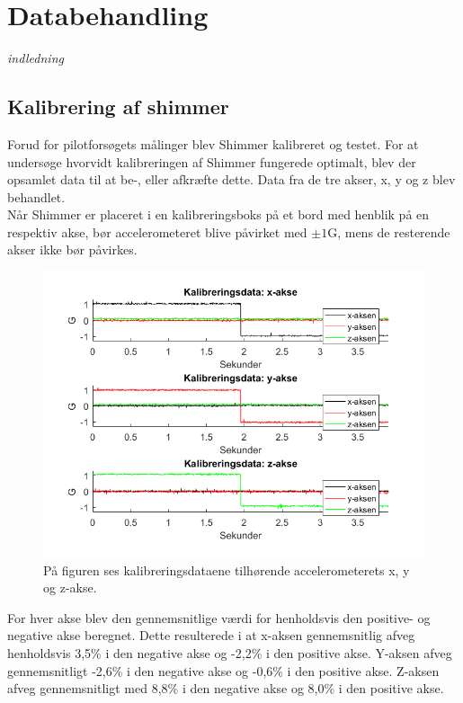 \section{Databehandling}
\textit{indledning}


\subsection{Kalibrering af shimmer}
Forud for pilotforsøgets målinger blev Shimmer kalibreret og testet. For at undersøge hvorvidt kalibreringen af Shimmer fungerede optimalt, blev der opsamlet data til at be-, eller afkræfte dette. Data fra de tre akser, x, y og z blev behandlet. \\
Når Shimmer er placeret i en kalibreringsboks på et bord med henblik på en respektiv akse, bør accelerometeret blive påvirket med $\pm 1$G, mens de resterende akser ikke bør påvirkes.

\begin{figure}[H]
	\centering
	\includegraphics[scale=0.68]{figures/qBilag/kalibreringsdata}
	\caption{På figuren ses kalibreringsdataene tilhørende accelerometerets x, y og z-akse.}
	\label{fig:Ap_Kalibrering}
\end{figure}

For hver akse blev den gennemsnitlige værdi for henholdsvis den positive- og negative akse beregnet. Dette resulterede i at x-aksen gennemsnitlig afveg henholdsvis 3,5\% i den negative akse og -2,2\% i den positive akse. Y-aksen afveg gennemsnitligt -2,6\% i den negative akse og -0,6\% i den positive akse. Z-aksen afveg  gennemsnitligt med 8,8\% i den negative akse og 8,0\% i den positive akse.


